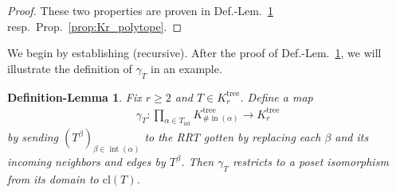 \documentclass[11pt]{amsart}
\newtheorem{deflem}[theorem]{Definition-Lemma}
\theoremstyle{definition}
\theoremstyle{remark}
\theoremstyle{plain}
\newcommand{\on}{\operatorname}
\newcommand{\incom}{\on{in}}
\newcommand{\inte}{{\on{int}}}
\newcommand{\tree}{{\on{tree}}}
\newcommand{\cl}{\mathrm{cl}}
\begin{document}
\begin{proof}
These two properties are proven in Def.-Lem.~\ref{deflem:gammaT} resp.\ Prop.~\ref{prop:Kr_polytope}.
\end{proof}

\noindent We begin by establishing {\sc(recursive)}.
After the proof of Def.-Lem.~\ref{deflem:gammaT}, we will illustrate the definition of $\gamma_T$ in an example.

\begin{deflem}
\label{deflem:gammaT}
Fix $r \geq 2$ and $T \in K_r^\tree$.
Define a map
\begin{align}
\gamma_T\colon \prod_{\alpha \in T_\inte} K_{\#\!\incom(\alpha)}^\tree \to K_r^\tree
\end{align}
by sending $(T^\beta)_{\beta \in \inte(\alpha)}$ to the RRT gotten by replacing each $\beta$ and its incoming neighbors and edges by $T^\beta$.
Then $\gamma_T$ restricts to a poset isomorphism from its domain to $\cl(T)$.
\end{deflem}
\end{document}
